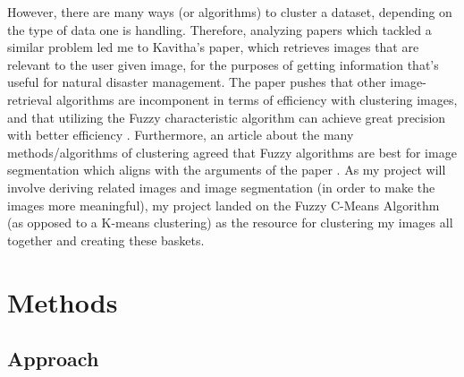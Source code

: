 \documentclass[10pt,twocolumn]{article}
\begin{document}
\indent However, there are many ways (or algorithms) to cluster a dataset, depending on the type of data one is handling. Therefore, analyzing papers which tackled a similar problem led me to Kavitha’s paper, which retrieves images that are relevant to the user given image, for the purposes of getting information that’s useful for natural disaster management. The paper pushes that other image-retrieval algorithms are incomponent in terms of efficiency with clustering images, and that utilizing the Fuzzy characteristic algorithm can achieve great precision with better efficiency \cite{Kavitha2020}. Furthermore, an article about the many methods/algorithms of clustering agreed that Fuzzy algorithms are best for image segmentation which aligns with the arguments of the paper \cite{PrasadClustering}. As my project will involve deriving related images and image segmentation (in order to make the images more meaningful), my project landed on the Fuzzy C-Means Algorithm (as opposed to a K-means clustering) as the resource for clustering my images all together and creating these baskets.

\section {Methods}

\subsection {Approach}
\end{document}
